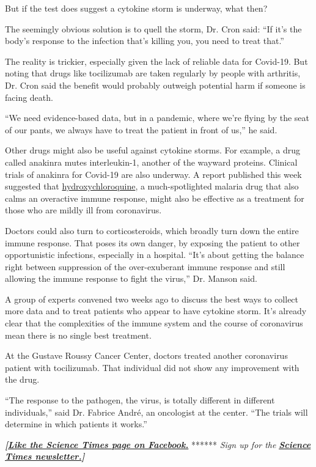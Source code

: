 But if the test does suggest a cytokine storm is underway, what then?

The seemingly obvious solution is to quell the storm, Dr. Cron said:
``If it's the body's response to the infection that's killing you, you
need to treat that.''

The reality is trickier, especially given the lack of reliable data for
Covid-19. But noting that drugs like tocilizumab are taken regularly by
people with arthritis, Dr. Cron said the benefit would probably outweigh
potential harm if someone is facing death.

``We need evidence-based data, but in a pandemic, where we're flying by
the seat of our pants, we always have to treat the patient in front of
us,'' he said.

Other drugs might also be useful against cytokine storms. For example, a
drug called anakinra mutes interleukin-1, another of the wayward
proteins. Clinical trials of anakinra for Covid-19 are also underway. A
report published this week suggested that
\href{https://www.nytimes3xbfgragh.onion/2020/04/01/health/hydroxychloroquine-coronavirus-malaria.html}{hydroxychloroquine},
a much-spotlighted malaria drug that also calms an overactive immune
response, might also be effective as a treatment for those who are
mildly ill from coronavirus.

Doctors could also turn to corticosteroids, which broadly turn down the
entire immune response. That poses its own danger, by exposing the
patient to other opportunistic infections, especially in a hospital.
``It's about getting the balance right between suppression of the
over-exuberant immune response and still allowing the immune response to
fight the virus,'' Dr. Manson said.

A group of experts convened two weeks ago to discuss the best ways to
collect more data and to treat patients who appear to have cytokine
storm. It's already clear that the complexities of the immune system and
the course of coronavirus mean there is no single best treatment.

At the Gustave Roussy Cancer Center, doctors treated another coronavirus
patient with tocilizumab. That individual did not show any improvement
with the drug.

``The response to the pathogen, the virus, is totally different in
different individuals,'' said Dr. Fabrice André, an oncologist at the
center. ``The trials will determine in which patients it works.''

\textbf{\emph{{[}}\href{http://on.fb.me/1paTQ1h}{\emph{Like the Science
Times page on Facebook.}}} ****** \emph{\textbar{} Sign up for the}
\textbf{\href{http://nyti.ms/1MbHaRU}{\emph{Science Times
newsletter.}}\emph{{]}}}

